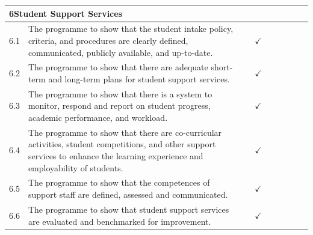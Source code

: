 \begin{longtable}{|p{0.6cm}|>{\raggedright\arraybackslash}p{9.2cm}|c|c|c|c|c|c|c|}
  \multicolumn{9}{|l|}{\cellcolor{gray!15}\textbf{6\quad Student Support Services}} \\
  \hline
  6.1 & The programme to show that the student intake policy, criteria, and procedures are clearly defined, communicated, publicly available, and up-to-date. & & $\checkmark$ & & & & & \\
  \hline
  6.2 & The programme to show that there are adequate short-term and long-term plans for student support services. & & $\checkmark$ & & & & & \\
  \hline
  6.3 & The programme to show that there is a system to monitor, respond and report on student progress, academic performance, and workload. & & $\checkmark$ & & & & & \\
  \hline
  6.4 & The programme to show that there are co-curricular activities, student competitions, and other support services to enhance the learning experience and employability of students. & & $\checkmark$ & & & & & \\
  \hline
  6.5 & The programme to show that the competences of support staff are defined, assessed and communicated. & & $\checkmark$ & & & & & \\
  \hline
  6.6 & The programme to show that student support services are evaluated and benchmarked for improvement. & & $\checkmark$ & & & & & \\
  \hline


\end{longtable}
